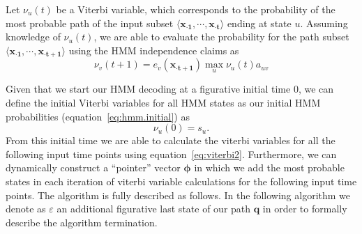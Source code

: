 Let $ \nu_u(t) $ be a Viterbi variable, which corresponds to the probability of the most probable path of the input subset $ \langle \mathbf{{x}_{\cdot 1}}, \cdots, \mathbf{{x}_{\cdot t}} \rangle $ ending at state $ u $. Assuming knowledge of $ \nu_u(t) $, we are able to evaluate the probability for the path subset $ \langle \mathbf{{x}_{\cdot 1}}, \cdots, \mathbf{{x}_{\cdot t+1}} \rangle $ using the HMM independence claims as
\begin{equation}
  \label{eq:viterbi2}
  \nu_v(t+1) = e_v(\mathbf{{x}_{\cdot t+1}}) \max_{u} \nu_u(t) a_{uv}
\end{equation}

Given that we start our HMM decoding at a figurative initial time $ 0 $, we can define the initial Viterbi variables for all HMM states as our initial HMM probabilities (equation~\ref{eq:hmm.initial}) as
\begin{equation}
  \label{eq:viterbi3}
  \nu_u(0) = s_u.
\end{equation}
From this initial time we are able to calculate the viterbi variables for all the following input time points using equation~\ref{eq:viterbi2}. Furthermore, we can dynamically construct a ``pointer'' vector $\boldsymbol\phi$ in which we add the most probable states in each iteration of viterbi variable calculations for the following input time points. The algorithm is fully described as follows. In the following algorithm we denote as $ \varepsilon $ an additional figurative last state of our path $ \mathbf{q} $ in order to formally describe the algorithm termination.

